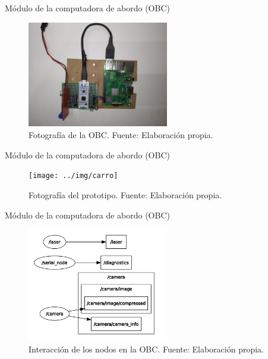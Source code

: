 \documentclass[10pt]{beamer}
\begin{document}
\begin{frame}{Módulo de la computadora de abordo (OBC)}
    \begin{figure}[!h] 
        \centering
        \includegraphics[width=0.55\textwidth]{../img/obc}
        \caption[Fotografía de la OBC]{Fotografía de la OBC. Fuente: Elaboración propia. }
    \end{figure}
\end{frame}

\begin{frame}{Módulo de la computadora de abordo (OBC)}
    \begin{figure}[!h] 
        \centering
        \texttt{[image: ../img/carro]}
        \caption[Fotografía del prototipo]{Fotografía del prototipo. Fuente: Elaboración propia. }
        \end{figure}
\end{frame}

\begin{frame}{Módulo de la computadora de abordo (OBC)}
    \begin{figure}[!h] 
        \centering
        \includegraphics[width=0.55\textwidth]{../img/nodosobc}
        \caption[Interacción de los nodos en la OBC]{Interacción de los nodos en la OBC. Fuente: Elaboración propia. }
    
    \end{figure}
\end{frame}
\end{document}
